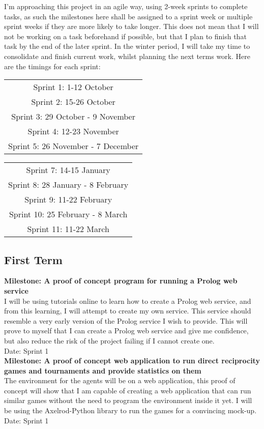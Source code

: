 \documentclass{article}
\begin{document}
I'm approaching this project in an agile way, using 2-week sprints to complete tasks, as such the milestones here shall be assigned to a sprint week or multiple sprint weeks if they are more likely to take longer. This does not mean that I will not be working on a task beforehand if possible, but that I plan to finish that task by the end of the later sprint. In the winter period, I will take my time to consolidate and finish current work, whilst planning the next terms work. Here are the timings for each sprint:
\begin{center}
	\begin{tabular}{c}
	Sprint 1: 1-12 October \\
	Sprint 2: 15-26 October\\
	Sprint 3: 29 October - 9 November\\
	Sprint 4: 12-23 November\\
	Sprint 5: 26 November - 7 December\\
	\end{tabular}
	\begin{tabular}{c}
	Sprint 7: 14-15 January\\
	Sprint 8: 28 January - 8 February\\
	Sprint 9: 11-22 February\\
	Sprint 10: 25 February - 8 March\\
	Sprint 11: 11-22 March\\
	\end{tabular}
\end{center}

\subsection*{First Term}

\noindent\textbf{Milestone: A proof of concept program for running a Prolog web service}\\
I will be using tutorials online to learn how to create a Prolog web service, and from this learning, I will attempt to create my own service. This service should resemble a very early version of the Prolog service I wish to provide. This will prove to myself that I can create a Prolog web service and give me confidence, but also reduce the risk of the project failing if I cannot create one.\\
Date: Sprint 1\\

\noindent\textbf{Milestone: A proof of concept web application to run direct reciprocity games and tournaments and provide statistics on them}\\
The environment for the agents will be on a web application, this proof of concept will show that I am capable of creating a web application that can run similar games without the need to program the environment inside it yet. I will be using the Axelrod-Python library to run the games for a convincing mock-up.\\
Date: Sprint 1\\
\end{document}

